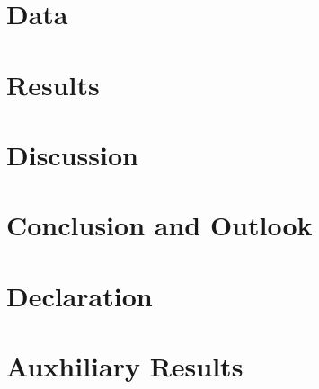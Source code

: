 \documentclass[12pt]{report}
\begin{document}
  \chapter{Data}
  \label{section:data}
  
  
  \chapter{Results}
  \label{section:results}
  
  
  \chapter{Discussion}
  \label{section:discussion}
  

  \chapter{Conclusion and Outlook}
  \label{section:conclusion_outlook}
  

  \chapter*{Declaration}
  

   

  \appendix
  \chapter{Auxhiliary Results}
  
\end{document}
